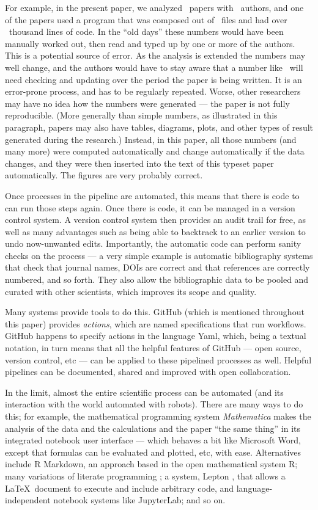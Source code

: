 \documentclass{comjnl}
\begin{document}
\begin{change}
For example, in the present paper, we analyzed \the\dataN\ papers with \the\countAuthors\ authors, and one of the papers used a program that was composed out of \covidsimfiles\ files and had over \covidsimkLOC\ thousand lines of code. In the ``old days'' these numbers would have been manually worked out, then read and typed up by one or more of the authors. This is a potential source of error. As the analysis is extended the numbers may well change, and the authors would have to stay aware that a number like \the\dataN\ will need checking and updating over the period the paper is being written. It is an error-prone process, and has to be regularly repeated. Worse, other researchers may have no idea how the numbers were generated --- the paper is not fully reproducible. (More generally than simple numbers, as illustrated in this paragraph, papers may also have tables, diagrams, plots, and other types of result generated during the research.) Instead, in this paper, all those numbers (and many more) were computed automatically and change automatically if the data changes, and they were then inserted into the text of this typeset paper automatically. The figures are very probably correct.

Once processes in the pipeline are automated, this means that there is code to can run those steps again. Once there is code, it can be managed in a version control system. A version control system then provides an audit trail for free, as well as many advantages such as being able to backtrack to an earlier version to undo now-unwanted edits. Importantly, the automatic code can perform sanity checks on the process --- a very simple example is automatic bibliography systems that check that journal names, DOIs are correct and that references are correctly numbered, and so forth. They also allow the bibliographic data to be pooled and curated with other scientists, which improves its scope and quality.

Many systems provide tools to do this. GitHub (which is mentioned throughout this paper) provides \emph{actions\/}, which are named specifications that run workflows. GitHub happens to specify actions in the language Yaml, which, being a textual notation, in turn means that all the helpful features of GitHub --- open source, version control, etc --- can be applied to these pipelined processes as well. Helpful pipelines can be documented, shared and improved with open collaboration.

In the limit, almost the entire scientific process can be automated (and its interaction with the world automated with robots). There are many ways to do this; for example, the mathematical programming system \emph{Mathematica\/} makes the analysis of the data and the calculations and the paper ``the same thing'' in its integrated notebook user interface --- which behaves a bit like Microsoft Word, except that formulas can be evaluated and plotted, etc, with ease. Alternatives include R Markdown, an approach based in the open mathematical system R; many variations of literate programming \cite{relit}; a system, Lepton  \cite{lepton}, that allows a \LaTeX\ document to execute and include arbitrary code, and language-independent notebook systems like JupyterLab; and so on.


\end{change}
\end{document}
